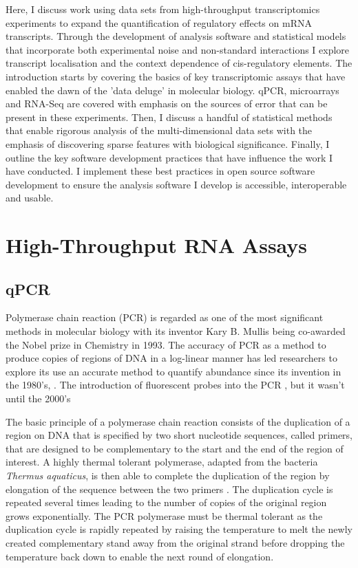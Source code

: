 \documentclass[../main.tex]{subfiles}
\begin{document}
Here, I discuss work using data sets from high-throughput transcriptomics experiments to expand the quantification of regulatory effects on mRNA transcripts. 
Through the development of analysis software and statistical models that incorporate both experimental noise and non-standard interactions I explore transcript localisation and the context dependence of cis-regulatory elements. 
The introduction starts by covering the basics of key transcriptomic assays that have enabled the dawn of the 'data deluge' in molecular biology. 
qPCR, microarrays and RNA-Seq are covered with emphasis on the sources of error that can be present in these experiments. 
Then, I discuss a handful of statistical methods that enable rigorous analysis of the multi-dimensional data sets with the emphasis of discovering sparse features with biological significance. 
Finally, I outline the key software development practices that have influence the work I have conducted. 
I implement these best practices in open source software development to ensure the analysis software I develop is accessible, interoperable and usable.

\section{High-Throughput RNA Assays}

\subsection{qPCR}

Polymerase chain reaction (PCR) is regarded as one of the most significant methods in molecular biology with its inventor Kary B. Mullis being co-awarded the Nobel prize in Chemistry in 1993.
The accuracy of PCR as a method to produce copies of regions of DNA in a log-linear manner has led researchers to explore its use an accurate method to quantify abundance since its invention in the 1980's, \parencite{Saiki1988}.
The introduction of fluorescent probes into the PCR  \parencite{Holland1991}, but it wasn't until the 2000's \cite{Walker2002}




The basic principle of a polymerase chain reaction consists of the duplication of a region on DNA that is specified by two short nucleotide sequences, called primers, that are designed to be complementary to the start and the end of the region of interest. 
A highly thermal tolerant polymerase, adapted from the bacteria \textit{Thermus aquaticus}, is then able to complete the duplication of the region by elongation of the sequence between the two primers \parencite{Holland1991}.
The duplication cycle is repeated several times leading to the number of copies of the original region grows exponentially.
The PCR polymerase must be thermal tolerant as the duplication cycle is rapidly repeated by raising the temperature to melt the newly created complementary stand away from the original strand before dropping the temperature back down to enable the next round of elongation. 
\end{document}
